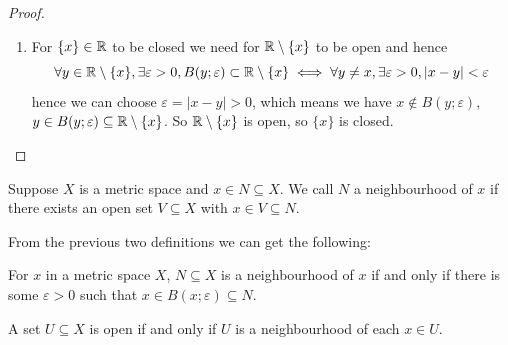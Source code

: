 \documentclass[10pt, a4paper]{article}
\begin{document}
\begin{example}
\begin{proof}
\begin{enumerate}[label = \arabic*.]
            \item
            For $\{x\} \in \mathbb{R}$ to be closed we need for $\mathbb{R} \setminus \{x\}$ to be open and hence
            \[
            \forall y \in \mathbb{R} \setminus \{x\}, \exists \varepsilon > 0, B(y; \varepsilon) \subset \mathbb{R} \setminus \{x\} \iff \forall y \neq x, \exists \varepsilon > 0, |x - y| < \varepsilon
            \]
            hence we can choose $\varepsilon = |x - y| > 0$,
            which means we have $x \notin B(y; \varepsilon)$,
            $y \in B(y; \varepsilon) \subseteq \mathbb{R} \setminus \{x\}$.
            So $\mathbb{R} \setminus \{x\}$ is open,
            so $\{x\}$ is closed.
        \end{enumerate}
    \end{proof}
\end{example}

\begin{definition}
    Suppose $X$ is a metric space and $x \in N \subseteq X$.
    We call $N$ a neighbourhood of $x$ if there exists an open set $V \subseteq X$ with $x \in V \subseteq N$.
\end{definition}

From the previous two definitions we can get the following:
\begin{corollary}
    For $x$ in a metric space $X$,
    $N \subseteq X$ is a neighbourhood of $x$ if and only if there is some $\varepsilon > 0$ such that $x \in B(x; \varepsilon) \subseteq N$.

    A set $U \subseteq X$ is open if and only if $U$ is a neighbourhood of each $x \in U$.
\end{corollary}
\end{document}
